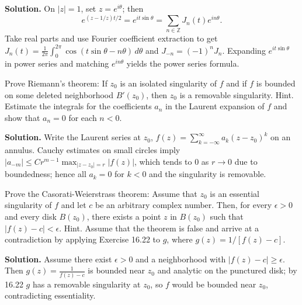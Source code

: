 \noindent\textbf{Solution.}
On $|z|=1$, set $z=e^{i\theta}$; then
\[e^{(z-1/z)t/2}=e^{i t\sin\theta}=\sum_{n\in\mathbb Z} J_n(t)e^{in\theta}.
\]
Take real parts and use Fourier coefficient extraction to get $J_n(t)=\frac{1}{2\pi}\int_0^{2\pi}\cos(t\sin\theta-n\theta)\,d\theta$ and $J_{-n}=(-1)^nJ_n$. Expanding $e^{i t\sin\theta}$ in power series and matching $e^{in\theta}$ yields the power series formula.

\begin{problembox}
Prove Riemann's theorem: If \( z_0 \) is an isolated singularity of \( f \) and if \( f \) is bounded on some deleted neighborhood \( B'(z_0) \), then \( z_0 \) is a removable singularity. Hint. Estimate the integrals for the coefficients \( a_n \) in the Laurent expansion of \( f \) and show that \( a_n = 0 \) for each \( n < 0 \).
\end{problembox}

\noindent\textbf{Solution.}
Write the Laurent series at $z_0$, $f(z)=\sum_{k=-\infty}^{\infty} a_k(z-z_0)^k$ on an annulus. Cauchy estimates on small circles imply $|a_{-m}|\le C r^{m-1}\max_{|z-z_0|=r}|f(z)|$, which tends to $0$ as $r\to0$ due to boundedness; hence all $a_{k}=0$ for $k<0$ and the singularity is removable.

\begin{problembox}
Prove the Casorati-Weierstrass theorem: Assume that \( z_0 \) is an essential singularity of \( f \) and let \( c \) be an arbitrary complex number. Then, for every \( \epsilon > 0 \) and every disk \( B(z_0) \), there exists a point \( z \) in \( B(z_0) \) such that \( |f(z) - c| < \epsilon \). Hint. Assume that the theorem is false and arrive at a contradiction by applying Exercise 16.22 to \( g \), where \( g(z) = 1/[f(z) - c] \).
\end{problembox}

\noindent\textbf{Solution.}
Assume there exist $\epsilon>0$ and a neighborhood with $|f(z)-c|\ge\epsilon$. Then $g(z)=\frac{1}{f(z)-c}$ is bounded near $z_0$ and analytic on the punctured disk; by 16.22 $g$ has a removable singularity at $z_0$, so $f$ would be bounded near $z_0$, contradicting essentiality.

